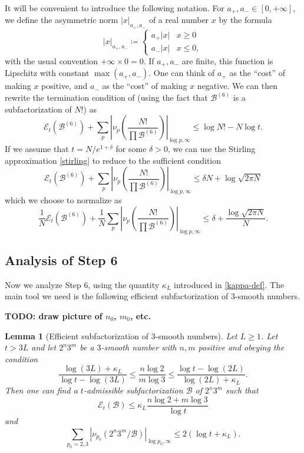 \documentclass[12pt,a4paper,reqno]{amsart}
\numberwithin{equation}{section}
\theoremstyle{plain}
\newtheorem{lemma}[theorem]{Lemma}
\theoremstyle{definition}
\newcommand\tuple{{\mathcal B}}
\newcommand\excess{{\mathcal{E}}}
\begin{document}
It will be convenient to introduce the following notation.
For $a_+,a_- \in [0,+\infty]$, we define the asymmetric norm $|x|_{a_+,a_-}$ of a real number $x$ by the formula
$$ 
|x|_{a_+,a_-} \coloneqq  \begin{cases} 
  a_+ |x| & x\geq 0 \\
  a_- |x| & x\leq 0,
\end{cases}
$$
with the usual convention $+\infty \times 0 = 0$.
If $a_+,a_-$ are finite, this function is Lipschitz with constant $\max(a_+,a_-)$.  One can think of $a_+$ as the ``cost'' of making $x$ positive, and $a_-$ as the
``cost'' of making $x$ negative. We can then rewrite the termination condition of  (using the fact that $\tuple^{(6)}$ is a subfactorization of $N!$) as
$$
\excess_t(\tuple^{(6)}) + \sum_p \left| \nu_p\left(\frac{N!}{\prod \tuple^{(6)}}\right) \right|_{\log p,\infty}
\leq \log N! - N \log t.$$
If we assume that $t = N/e^{1+\delta}$ for some $\delta > 0$, we can use the Stirling approximation \eqref{stirling} to reduce to the sufficient condition
$$
\excess_t(\tuple^{(6)}) + \sum_p \left| \nu_p\left(\frac{N!}{\prod \tuple^{(6)}}\right) \right|_{\log p,\infty}
\leq \delta N + \log \sqrt{2\pi N}
$$
which we choose to normalize as
\begin{equation}\label{step7-cond}
\frac{1}{N}  \excess_t(\tuple^{(6)}) + \frac{1}{N} \sum_p \left| \nu_p\left(\frac{N!}{\prod \tuple^{(6)}}\right) \right|_{\log p,\infty}
  \leq \delta + \frac{\log \sqrt{2\pi N}}{N}.
\end{equation}


\subsection{Analysis of Step 6}

Now we analyze Step 6, using the quantity $\kappa_L$ introduced in \eqref{kappa-def}.  The main tool we need is the following efficient subfactorization of $3$-smooth numbers.

{\bf TODO: draw picture of $n_0$, $m_0$, etc.}

\begin{lemma}[Efficient subfactorization of $3$-smooth numbers]\label{bound23}  Let $L \geq 1$.  Let $t > 3L$ and let $2^n 3^m$ be a $3$-smooth number with $n,m$ positive and obeying the condition
  \begin{equation}\label{B-bound}
    \frac{\log(3L)+\kappa_L}{\log t - \log(3L)} \leq \frac{n \log 2}{m \log 3} \leq \frac{\log t - \log(2L)}{\log(2L)+\kappa_L}.
  \end{equation}
    Then one can find a $t$-admissible subfactorization $\tuple$ of $2^n 3^m$ such that
  \begin{equation}\label{excess-bound} 
    \excess_t(\tuple) \leq \kappa_L \frac{n \log 2 + m \log 3}{\log t} 
  \end{equation}
  and
  \begin{equation}\label{surplus-bound} 
    \sum_{p_0=2,3} |\nu_{p_0}(2^n 3^m/\tuple)|_{\log p_0,\infty} \leq 2(\log t + \kappa_L).
  \end{equation}
  \end{lemma}
  
\end{document}
